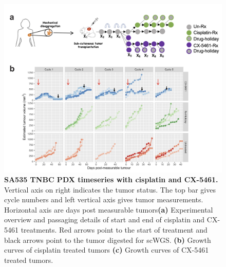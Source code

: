 \begin{figure}
\centering
\includegraphics[width=\textwidth]{Figures/chap4/SA535CX5461.png}
	
\caption[SA535 TNBC PDX timeseries with CX-5461]
	{\small
 \textbf{SA535 TNBC PDX timeseries with cisplatin and CX-5461.}
Vertical axis on right indicates the tumor status. The top bar gives cycle numbers and left vertical axis gives tumor measurements. Horizontal axis are days post measurable tumors\textbf{(a)} Experimental overview and passaging details of start and end of cisplatin and CX-5461 treatments. Red arrows point to the start of treatment and black arrows point to the tumor digested for scWGS.
	   \textbf{(b)} Growth curves of cisplatin treated tumors
	    \textbf{(c)} Growth curves of CX-5461 treated tumors.
	}
	\label{fig:SA535CX5461}
\end{figure}

